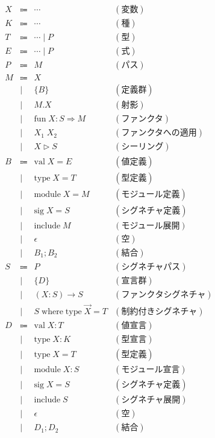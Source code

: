 \documentclass[12pt]{article}
\begin{document}
\pagestyle{empty}

\begin{align*}
    \begin{array}{rcll}
        X
        &\Coloneqq &\cdots &(\text{変数}) \\
        K
        &\Coloneqq &\cdots &(\text{種}) \\
        T
        &\Coloneqq &\cdots \mid P &(\text{型}) \\
        E
        &\Coloneqq &\cdots \mid P &(\text{式}) \\
        P
        &\Coloneqq &M &(\text{パス}) \\
        M
        &\Coloneqq &X \\
        &\mid &\{B\} &(\text{定義群}) \\
        &\mid &M.X &(\text{射影}) \\
        &\mid &\mathrm{fun}\;X: S \Rightarrow M &(\text{ファンクタ}) \\
        &\mid &X_1\; X_2 &(\text{ファンクタへの適用}) \\
        &\mid &X \triangleright S &(\text{シーリング}) \\
        B
        &\Coloneqq &\mathrm{val}\; X = E &(\text{値定義}) \\
        &\mid &\mathrm{type}\; X = T &(\text{型定義}) \\
        &\mid &\mathrm{module}\; X = M &(\text{モジュール定義}) \\
        &\mid &\mathrm{sig}\; X = S &(\text{シグネチャ定義}) \\
        &\mid &\mathrm{include}\; M &(\text{モジュール展開}) \\
        &\mid &\epsilon &(\text{空}) \\
        &\mid &B_1; B_2 &(\text{結合}) \\
        S
        &\Coloneqq &P &(\text{シグネチャパス}) \\
        &\mid &\{D\} &(\text{宣言群}) \\
        &\mid &(X: S) \rightarrow S &(ファンクタシグネチャ) \\
        &\mid &S\;\mathrm{where}\;\mathrm{type}\;\overrightarrow{X} = T &(\text{制約付きシグネチャ}) \\
        D
        &\Coloneqq &\mathrm{val}\; X: T &(\text{値宣言}) \\
        &\mid &\mathrm{type}\; X: K &(\text{型宣言}) \\
        &\mid &\mathrm{type}\; X = T &(\text{型定義}) \\
        &\mid &\mathrm{module}\; X: S &(\text{モジュール宣言}) \\
        &\mid &\mathrm{sig}\; X = S &(\text{シグネチャ定義}) \\
        &\mid &\mathrm{include}\; S &(\text{シグネチャ展開}) \\
        &\mid &\epsilon &(\text{空}) \\
        &\mid &D_1; D_2 &(\text{結合})
    \end{array}
\end{align*}
\end{document}
